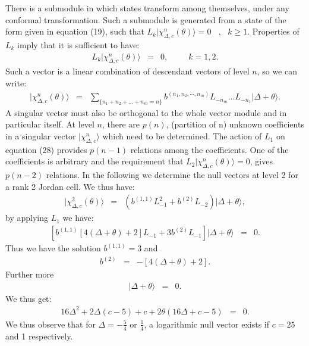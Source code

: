 \documentclass[a4paper,11pt]{article}
\begin{document}
There is a submodule in which states transform among themselves,
under any conformal transformation. Such a submodule is generated
from a state of the form given in equation (19), such that
$L_{k}|\chi_{\Delta,c}^{n}(\theta)\rangle
=0\:\:\:\:,\:\:\:k\geq1$. Properties of $L_{k}$ imply that it is
sufficient to have:
\begin{eqnarray}
L_{k}|\chi_{\Delta,c}^{n}(\theta)\rangle&=&0 ,
\:\:\:\:\:\:\:\:\:\:\:k=1,2 .
\end{eqnarray}
Such a vector is a linear combination of descendant vectors of
level $n$, so we can write:
\begin{eqnarray}
|\chi_{\Delta,c}^{n}(\theta)\rangle&=&
\sum_{\{n_{1}+n_{2}+\ldots+n_{m}=n\}} b^{(n_{1},n_{2},\cdots,
n_{m})}L_{-n_{m}}\ldots L_{-n_{1}}|\Delta+\theta\rangle .
\end{eqnarray}
 A singular vector must also be orthogonal to the whole vector
module and in particular itself. At level $n$, there are $p(n)$,
(partition of n) unknown coefficients in a singular vector
$|\chi_{\Delta,c}^{n}\rangle$ which need to be determined. The
action of $L_{1}$ on equation (28) provides $p(n-1)$ relations
among the coefficients. One of the coefficients is arbitrary and the requirement that
$L_{2}|\chi_{\Delta,c}^{n}(\theta)\rangle=0$, gives $p(n-2)$
relations. In the following we determine the null vectors at level
2 for a rank 2 Jordan cell. We thus have:
\begin{eqnarray}
|\chi_{\Delta,c}^{2}(\theta)\rangle&=&\left(b^{(1,1)}L_{-1}^{2}+b^{(2)}L_{-2}\right)|\Delta+\theta\rangle
,
\end{eqnarray}
by applying $L_{1}$ we have:
\begin{eqnarray}
\left[b^{(1,1)}[4(\Delta+\theta)+2]L_{-1}+3b^{(2)}L_{-1}\right]|\Delta+\theta\rangle&=&0
.
\end{eqnarray}
Thus we have the solution $b^{(1,1)}=3$ and
\begin{eqnarray}
b^{(2)}&=&-[4(\Delta+\theta)+2] .
\end{eqnarray}
Further more
\begin{eqnarray}
[6b^{(1,1)}(\Delta+\theta)+b^{(2)}(4\Delta+\frac{c}{2}+4\theta)]|\Delta+\theta\rangle&=&0
.
\end{eqnarray}
We thus get:
\begin{eqnarray}
16\Delta^{2}+2\Delta(c-5)+c+2\theta(16\Delta+c-5)&=&0 .
\end{eqnarray}
We thus observe that for $\Delta=-\frac{5}{4}$ or $\frac{1}{4}$, a
logarithmic null vector exists if $c=25$ and 1 respectively.
\end{document}
